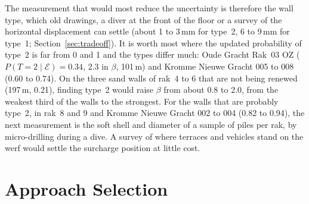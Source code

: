 The measurement that would most reduce the uncertainty is therefore the wall
type, which old drawings, a diver at the front of the floor or a survey of the
horizontal displacement can settle (about 1 to 3\,mm for type~2, 6 to 9\,mm
for type~1; Section~\ref{sec:tradeoff}). It is worth most where the updated probability
of type~2 is far from 0 and 1 and the types differ much: Oude Gracht Rak~03 OZ
($P(T{=}2 \mid \mathcal{E}) = 0.34$, 2.3 in $\beta$, 101\,m) and Kromme Nieuwe Gracht 005
to 008 (0.60 to 0.74). On the three sand walls of rak~4 to 6 that are not
being renewed (197\,m, 0.21), finding type~2 would raise $\beta$ from about 0.8
to 2.0, from the weakest third of the walls to the strongest. For the walls that are probably
type~2, in rak~8 and 9 and Kromme Nieuwe Gracht 002 to 004 (0.82 to 0.94), the
next measurement is the soft shell and diameter of a sample of piles per rak,
by micro-drilling during a dive. A survey of where terraces and vehicles stand
on the werf would settle the surcharge position at little cost.

\clearpage
\section{Approach Selection}
\label{sec:approach-selection}



